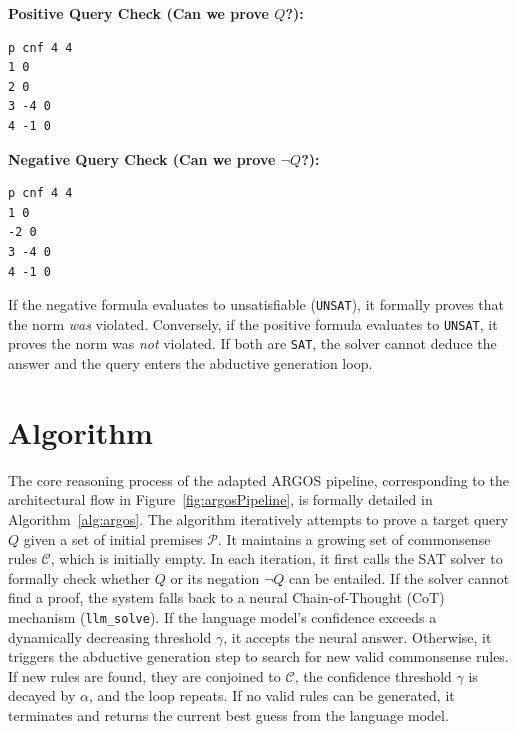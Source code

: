 \textbf{Positive Query Check (Can we prove $Q$?):}
\begin{verbatim}
p cnf 4 4
1 0
2 0
3 -4 0
4 -1 0
\end{verbatim}

\textbf{Negative Query Check (Can we prove $\neg Q$?):}
\begin{verbatim}
p cnf 4 4
1 0
-2 0
3 -4 0
4 -1 0
\end{verbatim}

If the negative formula evaluates to unsatisfiable (\texttt{UNSAT}), it formally proves that the norm \textit{was} violated. Conversely, if the positive formula evaluates to \texttt{UNSAT}, it proves the norm was \textit{not} violated. If both are \texttt{SAT}, the solver cannot deduce the answer and the query enters the abductive generation loop.

\section{Algorithm}
\label{sec:algorithm}

The core reasoning process of the adapted ARGOS pipeline, corresponding to the architectural flow in Figure~\ref{fig:argosPipeline}, is formally detailed in Algorithm~\ref{alg:argos}. The algorithm iteratively attempts to prove a target query $Q$ given a set of initial premises $\mathcal{P}$. It maintains a growing set of commonsense rules $\mathcal{C}$, which is initially empty. In each iteration, it first calls the SAT solver to formally check whether $Q$ or its negation $\neg Q$ can be entailed. If the solver cannot find a proof, the system falls back to a neural Chain-of-Thought (CoT) mechanism (\texttt{llm\_solve}). If the language model's confidence exceeds a dynamically decreasing threshold $\gamma$, it accepts the neural answer. Otherwise, it triggers the abductive generation step to search for new valid commonsense rules. If new rules are found, they are conjoined to $\mathcal{C}$, the confidence threshold $\gamma$ is decayed by $\alpha$, and the loop repeats. If no valid rules can be generated, it terminates and returns the current best guess from the language model.

